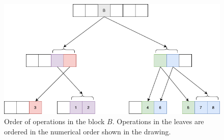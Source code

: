 \documentclass[acmsmall,nonacm,anonymous]{acmart}
\begin{document}
\begin{figure}[hbt]
  \center\includegraphics[width=5.5in]{pics/tree}
  \caption[Order of operations in a block.]{Order of operations in the block $B$. Operations in the leaves are ordered in the numerical order shown in the drawing.}
\end{figure}
\end{document}
